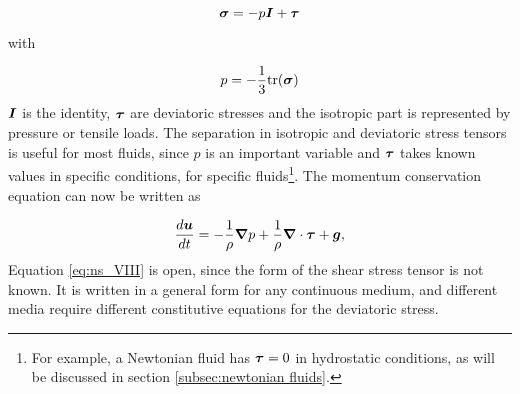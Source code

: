 %
	\begin{equation} \label{eq:cauchy_IV}
		\boldsymbol{\sigma}= -p\boldsymbol{I}+\boldsymbol{\tau} 
	\end{equation}
%
with

%
	\begin{equation} \label{eq:cauchy_V}
		p=-\frac{1}{3}\text{tr}(\boldsymbol{\sigma}) 
	\end{equation}
%
$\boldsymbol{I}$ is the identity, $\boldsymbol{\tau}$ are deviatoric stresses and the isotropic part is represented by pressure or tensile loads. The separation in isotropic and deviatoric stress tensors is useful for most fluids, since $p$ is an important variable and $\boldsymbol{\tau}$ takes known values in specific conditions, for specific fluids\footnote{For example, a Newtonian fluid has $\boldsymbol{\tau}=0$ in hydrostatic conditions, as will be discussed in section \ref{subsec:newtonian fluids}.}. The momentum conservation equation can now be written as

%
	\begin{equation} \label{eq:ns_VIII}
		\frac{d\boldsymbol{u}}{dt}= -\frac{1}{\rho}\boldsymbol{\nabla}p + \frac{1}{\rho}\boldsymbol{\nabla}  \cdot\boldsymbol{\tau} + \boldsymbol{g},
	\end{equation}
%
Equation \eqref{eq:ns_VIII} is open, since the form of the shear stress tensor is not known. It is written in a general form for any continuous medium, and different media require different constitutive equations for the deviatoric stress.


